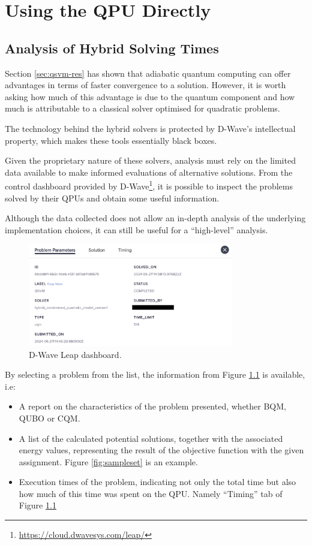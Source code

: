 \chapter{Using the QPU Directly}\label{sec:qpuonly}

\section{Analysis of Hybrid Solving Times}

Section \ref{sec:qsvm-res} has shown that adiabatic quantum computing can offer advantages in terms of faster convergence to a solution. However, it is worth asking how much of this advantage is due to the quantum component and how much is attributable to a classical solver optimised for quadratic problems.

The technology behind the hybrid solvers is protected by D-Wave's intellectual property, which makes these tools essentially black boxes. 

Given the proprietary nature of these solvers, analysis must rely on the limited data available to make informed evaluations of alternative solutions.
From the control dashboard provided by D-Wave\footnote{\url{https://cloud.dwavesys.com/leap/}}, it is possible to inspect the problems solved by their QPUs and obtain some useful information.

Although the data collected does not allow an in-depth analysis of the underlying implementation choices, it can still be useful for a ``high-level'' analysis.
\begin{figure}
    \centering
    \includegraphics[width=0.8\textwidth]{figures/dashboard.png}
    \caption{D-Wave Leap dashboard.}
    \label{fig:dwaveleap}
\end{figure}
By selecting a problem from the list, the information from Figure \ref{fig:dwaveleap} is available, i.e: 
\begin{itemize} 
	\item A report on the characteristics of the problem presented, whether BQM, QUBO or CQM. 
	\item A list of the calculated potential solutions, together with the associated energy values, representing the result of the objective function with the given assignment. Figure \ref{fig:sampleset} is an example. 
	\item Execution times of the problem, indicating not only the total time but also how much of this time was spent on the QPU. Namely ``Timing'' tab of Figure \ref{fig:dwaveleap}
\end{itemize}

